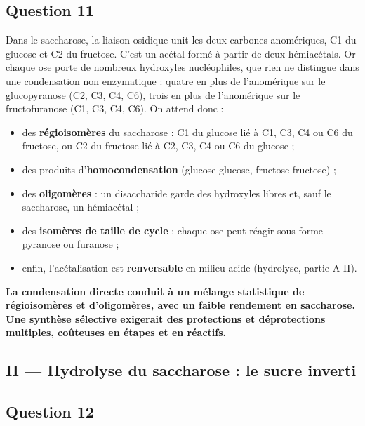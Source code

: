 \documentclass[11pt,a4paper]{article}
\providecommand{\tightlist}{\setlength{\itemsep}{0pt}\setlength{\parskip}{0pt}}
\begin{document}
\hypertarget{question-11}{%
\subsection{Question 11}\label{question-11}}

Dans le saccharose, la liaison osidique unit les deux carbones anomériques, C1 du glucose et C2 du fructose. C'est un acétal formé à partir de deux hémiacétals. Or chaque ose porte de nombreux hydroxyles nucléophiles, que rien ne distingue dans une condensation non enzymatique : quatre en plus de l'anomérique sur le glucopyranose (C2, C3, C4, C6), trois en plus de l'anomérique sur le fructofuranose (C1, C3, C4, C6). On attend donc :

\begin{itemize}
\tightlist
\item
  des \textbf{régioisomères} du saccharose : C1 du glucose lié à C1, C3, C4 ou C6 du fructose, ou C2 du fructose lié à C2, C3, C4 ou C6 du glucose ;
\item
  des produits d'\textbf{homocondensation} (glucose-glucose, fructose-fructose) ;
\item
  des \textbf{oligomères} : un disaccharide garde des hydroxyles libres et, sauf le saccharose, un hémiacétal ;
\item
  des \textbf{isomères de taille de cycle} : chaque ose peut réagir sous forme pyranose ou furanose ;
\item
  enfin, l'acétalisation est \textbf{renversable} en milieu acide (hydrolyse, partie A-II).
\end{itemize}

\textbf{La condensation directe conduit à un mélange statistique de régioisomères et d'oligomères, avec un faible rendement en saccharose. Une synthèse sélective exigerait des protections et déprotections multiples, coûteuses en étapes et en réactifs.}

\hypertarget{ii-hydrolyse-du-saccharose-le-sucre-inverti}{%
\subsection{II --- Hydrolyse du saccharose : le sucre inverti}\label{ii-hydrolyse-du-saccharose-le-sucre-inverti}}

\hypertarget{question-12}{%
\subsection{Question 12}\label{question-12}}
\end{document}
